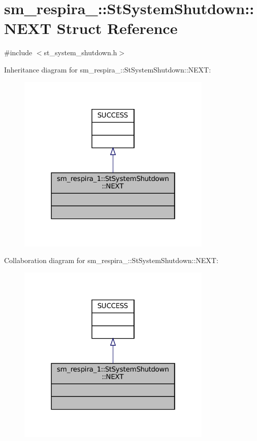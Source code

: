 \hypertarget{structsm__respira__1_1_1StSystemShutdown_1_1NEXT}{}\section{sm\+\_\+respira\+\_\+:\+:St\+System\+Shutdown\+:\+:N\+E\+XT Struct Reference}
\label{structsm__respira__1_1_1StSystemShutdown_1_1NEXT}


{\ttfamily \#include $<$st\+\_\+system\+\_\+shutdown.\+h$>$}



Inheritance diagram for sm\+\_\+respira\+\_\+:\+:St\+System\+Shutdown\+:\+:N\+E\+XT\+:
\nopagebreak
\begin{figure}[H]
\begin{center}
\leavevmode
\includegraphics[width=262pt]{structsm__respira__1_1_1StSystemShutdown_1_1NEXT__inherit__graph}
\end{center}
\end{figure}


Collaboration diagram for sm\+\_\+respira\+\_\+:\+:St\+System\+Shutdown\+:\+:N\+E\+XT\+:
\nopagebreak
\begin{figure}[H]
\begin{center}
\leavevmode
\includegraphics[width=262pt]{structsm__respira__1_1_1StSystemShutdown_1_1NEXT__coll__graph}
\end{center}
\end{figure}


